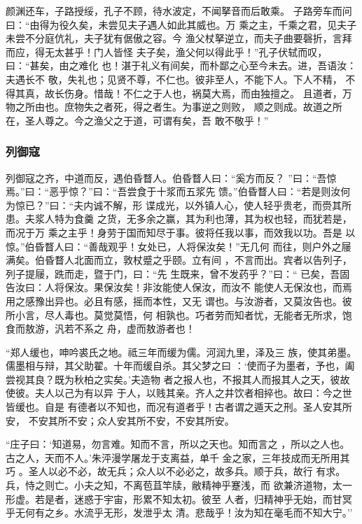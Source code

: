 \documentclass[]{article}
\begin{document}
颜渊还车，子路授绥，孔子不顾，待水波定，不闻拏音而后敢乘。
子路旁车而问曰：``由得为役久矣，未尝见夫子遇人如此其威也。万
乘之主，千乘之君，见夫子未尝不分庭伉礼，夫子犹有倨傲之容。今
渔父杖拏逆立，而夫子曲要磬折，言拜而应，得无太甚乎！门人皆怪
夫子矣，渔父何以得此乎！''孔子伏轼而叹，曰：``甚矣，由之难化
也！湛于礼义有间矣，而朴鄙之心至今未去。进，吾语汝：夫遇长不
敬，失礼也；见贤不尊，不仁也。彼非至人，不能下人。下人不精，
不得其真，故长伤身。惜哉！不仁之于人也，祸莫大焉，而由独擅之。
且道者，万物之所由也。庶物失之者死，得之者生。为事逆之则败，
顺之则成。故道之所在，圣人尊之。今之渔父之于道，可谓有矣，吾
敢不敬乎！''

\hypertarget{header-n2406}{%
\subsubsection{列御寇}\label{header-n2406}}

列御寇之齐，中道而反，遇伯昏瞀人。伯昏瞀人曰：``奚方而反？
''曰：``吾惊焉。''曰：``恶乎惊？''曰：``吾尝食于十浆而五浆先
馈。''伯昏瞀人曰：``若是则汝何为惊已？''曰：``夫内诚不解，形
谍成光，以外镇人心，使人轻乎贵老，而赍其所患。夫浆人特为食羹
之货，无多余之赢，其为利也薄，其为权也轻，而犹若是，而况于万
乘之主乎！身劳于国而知尽于事。彼将任我以事，而效我以功。吾是
以惊。''伯昏瞀人曰：``善哉观乎！女处已，人将保汝矣！''无几何
而往，则户外之屦满矣。伯昏瞀人北面而立，敦杖蹙之乎颐。立有间
，不言而出。宾者以告列子，列子提屦，跣而走，暨于门，曰：``先
生既来，曾不发药乎？''曰：``
已矣，吾固告汝曰：人将保汝。果保汝矣！非汝能使人保汝，而汝不
能使人无保汝也，而焉用之感豫出异也。必且有感，摇而本性，又无
谓也。与汝游者，又莫汝告也。彼所小言，尽人毒也。莫觉莫悟，何
相孰也。巧者劳而知者忧，无能者无所求，饱食而敖游，汎若不系之
舟，虚而敖游者也！

``郑人缓也，呻吟裘氏之地。祗三年而缓为儒。河润九里，泽及三
族，使其弟墨。儒墨相与辩，其父助翟。十年而缓自杀。其父梦之曰
：`使而子为墨者，予也，阖尝视其良？既为秋柏之实矣。'夫造物
者之报人也，不报其人而报其人之天，彼故使彼。夫人以己为有以异
于人，以贱其亲。齐人之井饮者相捽也。故曰：今之世皆缓也。自是
有德者以不知也，而况有道者乎！古者谓之遁天之刑。圣人安其所安，
不安其所不安；众人安其所不安，不安其所安。

``庄子曰：`知道易，勿言难。知而不言，所以之天也。知而言之
，所以之人也。古之人，天而不人。'朱泙漫学屠龙于支离益，单千
金之家，三年技成而无所用其巧
。圣人以必不必，故无兵；众人以不必必之，故多兵。顺于兵，故行
有求。兵，恃之则亡。小夫之知，不离苞苴竿牍，敝精神乎蹇浅，而
欲兼济道物，太一形虚。若是者，迷惑于宇宙，形累不知太初。彼至
人者，归精神乎无始，而甘冥乎无何有之乡。水流乎无形，发泄乎太
清。悲哉乎！汝为知在毫毛而不知大宁。''
\end{document}
